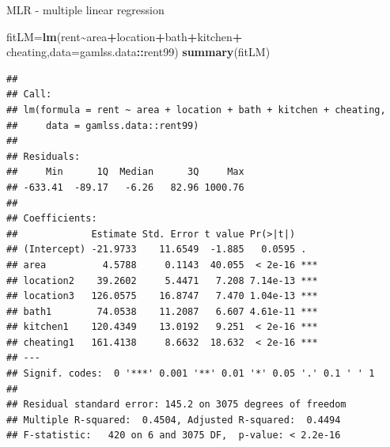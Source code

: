 \documentclass[
  ignorenonframetext,
]{beamer}
\newenvironment{Shaded}{\begin{snugshade}}{\end{snugshade}}
\newcommand{\AttributeTok}[1]{\textcolor[rgb]{0.13,0.29,0.53}{#1}}
\newcommand{\FunctionTok}[1]{\textcolor[rgb]{0.13,0.29,0.53}{\textbf{#1}}}
\newcommand{\NormalTok}[1]{#1}
\newcommand{\OtherTok}[1]{\textcolor[rgb]{0.56,0.35,0.01}{#1}}
\newcommand{\SpecialCharTok}[1]{\textcolor[rgb]{0.81,0.36,0.00}{\textbf{#1}}}
\begin{document}
\begin{frame}[fragile]
\begin{block}{MLR - multiple linear regression}
\protect\hypertarget{mlr---multiple-linear-regression}{}
\begin{Shaded}
\begin{Highlighting}[]
\NormalTok{fitLM}\OtherTok{=}\FunctionTok{lm}\NormalTok{(rent}\SpecialCharTok{\textasciitilde{}}\NormalTok{area}\SpecialCharTok{+}\NormalTok{location}\SpecialCharTok{+}\NormalTok{bath}\SpecialCharTok{+}\NormalTok{kitchen}\SpecialCharTok{+}
\NormalTok{         cheating,}\AttributeTok{data=}\NormalTok{gamlss.data}\SpecialCharTok{::}\NormalTok{rent99)}
\FunctionTok{summary}\NormalTok{(fitLM)}
\end{Highlighting}
\end{Shaded}

\begin{verbatim}
## 
## Call:
## lm(formula = rent ~ area + location + bath + kitchen + cheating, 
##     data = gamlss.data::rent99)
## 
## Residuals:
##     Min      1Q  Median      3Q     Max 
## -633.41  -89.17   -6.26   82.96 1000.76 
## 
## Coefficients:
##             Estimate Std. Error t value Pr(>|t|)    
## (Intercept) -21.9733    11.6549  -1.885   0.0595 .  
## area          4.5788     0.1143  40.055  < 2e-16 ***
## location2    39.2602     5.4471   7.208 7.14e-13 ***
## location3   126.0575    16.8747   7.470 1.04e-13 ***
## bath1        74.0538    11.2087   6.607 4.61e-11 ***
## kitchen1    120.4349    13.0192   9.251  < 2e-16 ***
## cheating1   161.4138     8.6632  18.632  < 2e-16 ***
## ---
## Signif. codes:  0 '***' 0.001 '**' 0.01 '*' 0.05 '.' 0.1 ' ' 1
## 
## Residual standard error: 145.2 on 3075 degrees of freedom
## Multiple R-squared:  0.4504, Adjusted R-squared:  0.4494 
## F-statistic:   420 on 6 and 3075 DF,  p-value: < 2.2e-16
\end{verbatim}
\end{block}
\end{frame}
\end{document}
